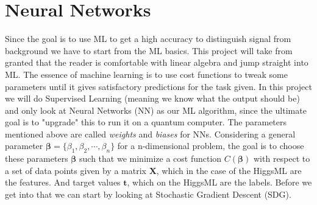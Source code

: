 \documentclass[14pt, a4paper]{book}
\begin{document}
\section{Neural Networks}
Since the goal is to use ML to get a high accuracy to distinguish signal from background we have to start from the ML basics.  This project will take from granted that the reader is comfortable with linear algebra and jump straight into ML. The essence of machine learning is to use cost functions to tweak some parameters until it gives satisfactory predictions for the task given. In this project we will do Supervised Learning (meaning we know what the output should be) and only look at Neural Networks (NN) as our ML algorithm, since the ultimate goal is to "upgrade" this to run it on a quantum computer. The parameters mentioned above are called \textit{weights} and \textit{biases} for NNs. Considering a general parameter $\bm{\beta} = \{\beta_1,\beta_2,\cdots,\beta_n\}$ for a n-dimensional problem, the goal is to choose these parameters $\bm{\beta}$ such that we minimize a cost function $C(\bm{\beta})$ with respect to a set of data points given by a matrix $\mathbf{X}$, which in the case of the HiggsML are the features. And target values $\mathbf{t}$, which on the HiggsML are the labels. Before we get into that we can start by looking at Stochastic Gradient Descent (SDG).
\end{document}
